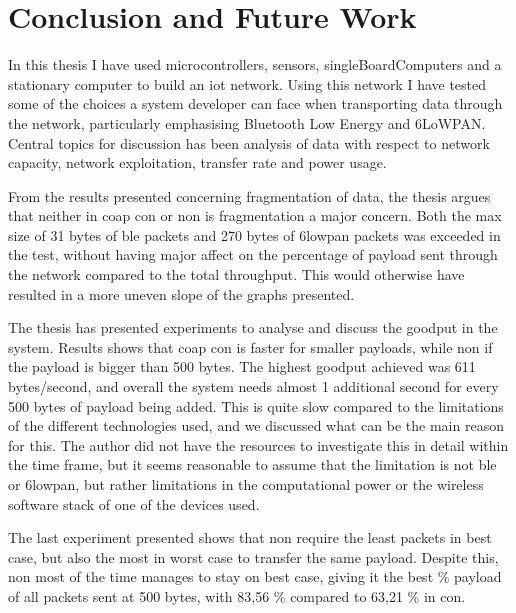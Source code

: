 \chapter{Conclusion and Future Work}
\label{chp:results}



\noindent In this thesis I have used \glspl{microcontroller}, sensors, \glspl{singleBoardComputer} and a stationary computer to build an \gls{iot} network. Using this network I have tested some of the choices a system developer can face when transporting data through the network, particularly emphasising Bluetooth Low Energy and 6LoWPAN. Central topics for discussion has been analysis of data with respect to network capacity, network exploitation, transfer rate and power usage. 

\noindent From the results presented concerning fragmentation of data, the thesis argues that neither in \gls{coap} \gls{con} or \gls{non} is fragmentation a major concern. Both the max size of 31 bytes of \gls{ble} packets and 270 bytes of \gls{6lowpan} packets was exceeded in the test, without having major affect on the percentage of \gls{payload} sent through the network compared to the total \gls{throughput}. This would otherwise have resulted in a more uneven slope of the graphs presented. 

\noindent The thesis has presented experiments to analyse and discuss the \gls{goodput} in the system. Results shows that \gls{coap} \gls{con} is faster for smaller \glspl{payload}, while \gls{non} if the \gls{payload} is bigger than 500 bytes. The highest \gls{goodput} achieved was 611 bytes/second, and overall the system needs almost 1 additional second for every 500 bytes of \gls{payload} being added. This is quite slow compared to the limitations of the different technologies used, and we discussed what can be the main reason for this. The author did not have the resources to investigate this in detail within the time frame, but it seems reasonable to assume that the limitation is not \gls{ble} or \gls{6lowpan}, but rather limitations in the computational power or the wireless software stack of one of the devices used. 

\noindent The last experiment presented shows that \gls{non} require the least packets in best case, but also the most in worst case to transfer the same \gls{payload}. Despite this, \gls{non} most of the time manages to stay on best case, giving it the best \% payload of all packets sent at 500 bytes, with 83,56 \% compared to 63,21 \% in \gls{con}.

